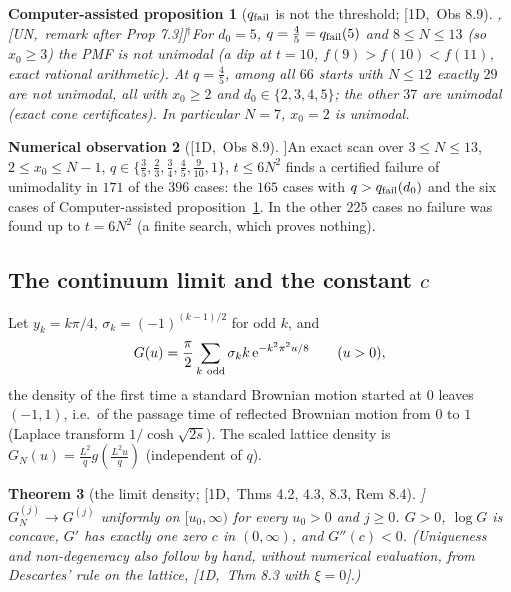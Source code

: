 \documentclass[10pt,a4paper]{article}
\theoremstyle{plain}
\newtheorem{theorem}{Theorem}[section]
\newtheorem{caproposition}[theorem]{Computer-assisted proposition}
\theoremstyle{definition}
\newtheorem{observation}[theorem]{Numerical observation}
\newcommand{\NEW}{\ensuremath{^{\dagger}}}       %
\newcommand{\src}[2]{[\textsf{#1},~#2]}           %
\newcommand{\ONE}{\textsf{1D}}
\newcommand{\UNI}{\textsf{UN}}
\newcommand{\ee}{\mathrm{e}}
\begin{document}
\begin{caproposition}[$q_{\rm fail}$ is not the threshold; \src{\ONE}{Obs 8.9}, \src{\UNI}{remark after Prop 7.3}]\NEW\label{prop:qfailnotsharp}
For $d_0=5$, $q=\frac45=q_{\rm fail}(5)$ and $8\le N\le13$ (so $x_0\ge3$) the PMF is not unimodal (a dip at $t=10$, $f(9)>f(10)<f(11)$, exact rational arithmetic). At $q=\frac45$, among all $66$ starts with $N\le12$ exactly $29$ are not unimodal, all with $x_0\ge2$ and $d_0\in\{2,3,4,5\}$; the other $37$ are unimodal (exact cone certificates). In particular $N=7$, $x_0=2$ is unimodal.
\end{caproposition}

\begin{observation}[\src{\ONE}{Obs 8.9}]\label{obs:startscan}
An exact scan over $3\le N\le13$, $2\le x_0\le N-1$, $q\in\{\frac35,\frac23,\frac34,\frac45,\frac9{10},1\}$, $t\le6N^2$ finds a certified failure of unimodality in $171$ of the $396$ cases: the $165$ cases with $q>q_{\rm fail}(d_0)$ and the six cases of Computer-assisted proposition~\ref{prop:qfailnotsharp}. In the other $225$ cases no failure was found up to $t=6N^2$ (a finite search, which proves nothing).
\end{observation}

\subsection{The continuum limit and the constant $c$}

Let $y_k=k\pi/4$, $\sigma_k=(-1)^{(k-1)/2}$ for odd $k$, and
\[
G(u)=\frac\pi2\sum_{k\ \rm odd}\sigma_kk\,\ee^{-k^2\pi^2u/8}\qquad(u>0),
\]
the density of the first time a standard Brownian motion started at $0$ leaves $(-1,1)$, i.e.\ of the passage time of reflected Brownian motion from $0$ to $1$ (Laplace transform $1/\cosh\sqrt{2s}$). The scaled lattice density is $G_N(u)=\frac{L^2}qg(\frac{L^2u}q)$ (independent of $q$).

\begin{theorem}[the limit density; \src{\ONE}{Thms 4.2, 4.3, 8.3, Rem 8.4}]\label{thm:1d-limitdensity}
$G_N^{(j)}\to G^{(j)}$ uniformly on $[u_0,\infty)$ for every $u_0>0$ and $j\ge0$. $G>0$, $\log G$ is concave, $G'$ has exactly one zero $c$ in $(0,\infty)$, and $G''(c)<0$. (Uniqueness and non-degeneracy also follow by hand, without numerical evaluation, from Descartes' rule on the lattice, \src{\ONE}{Thm 8.3 with $\xi=0$}.)
\end{theorem}
\end{document}

